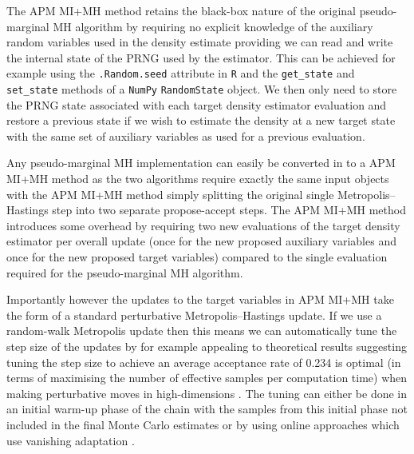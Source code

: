 The \ac{APM} \ac{MI}+\ac{MH} method retains the black-box nature of the original pseudo-marginal \ac{MH} algorithm by requiring no explicit knowledge of the auxiliary random variables used in the density estimate providing we can read and write the internal state of the \ac{PRNG} used by the estimator. This can be achieved for example using the \texttt{.Random.seed} attribute in \texttt{R} and the \texttt{get\_state} and \texttt{set\_state} methods of a \texttt{NumPy} \texttt{RandomState} object. We then only need to store the \ac{PRNG} state associated with each target density estimator evaluation and restore a previous state if we wish to estimate the density at a new target state with the same set of auxiliary variables as used for a previous evaluation.

Any pseudo-marginal \ac{MH} implementation can easily be converted in to a \ac{APM} \ac{MI}+\ac{MH} method as the two algorithms require exactly the same input objects with the \ac{APM} \ac{MI}+\ac{MH} method simply splitting the original single Metropolis--Hastings step into two separate propose-accept steps. The \ac{APM} \ac{MI}+\ac{MH} method introduces some overhead by requiring two new evaluations of the target density estimator per overall update (once for the new proposed auxiliary variables and once for the new proposed target variables) compared to the single evaluation required for the pseudo-marginal \ac{MH} algorithm. 

Importantly however the updates to the target variables in \ac{APM} \ac{MI}+\ac{MH} take the form of a standard perturbative Metropolis--Hastings update. If we use a random-walk Metropolis update then this means we can automatically tune the step size of the updates by for example appealing to theoretical results suggesting tuning the step size to achieve an average acceptance rate of 0.234 is optimal (in terms of maximising the number of effective samples per computation time) when making perturbative moves in high-dimensions \citep{gelman1997weak}. The tuning can either be done in an initial warm-up phase of the chain with the samples from this initial phase not included in the final Monte Carlo estimates or by using online approaches which use vanishing adaptation \citep{andrieu2008tutorial,graves2011automatic}. %

